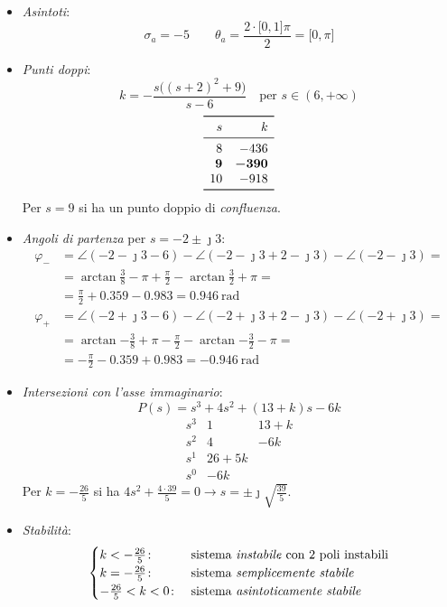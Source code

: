 \begin{itemize}
	\item \emph{Asintoti}:
		\[
			\sigma_a = -5 \qquad
			\theta_a = \frac{2\cdot\bigl[0,1\bigr]\pi}{2} = \bigl[0,\pi\bigr]
		\]
	\item \emph{Punti doppi}:
		\[
			k = -\frac{s\bigl((s+2)^2+9\bigr)}{s-6} \quad
			\text{per } s \in (6,+\infty)
		\]
		\[\begin{array}{rr}
			\toprule
			     s &         k \\
			\midrule
			     8 &      -436 \\
			\bm{9} & \bm{-390} \\
			    10 &      -918 \\
			\bottomrule
		\end{array}\]
		Per \(s=9\) si ha un punto doppio di \emph{confluenza}.
	\item \emph{Angoli di partenza} per \(s=-2\pm\jmath3\):
		\begin{align*}
			\varphi_- &= \angle(-2-\jmath3-6) -\angle(-2-\jmath3+2-\jmath3) -\angle(-2-\jmath3) = \\
				  &= \arctan{\frac{3}{8}} -\pi +\frac{\pi}{2} -\arctan{\frac{3}{2}} +\pi = \\
				  &= \frac{\pi}{2} +0.359 -0.983 = \SI{0.946}{\radian} \\
			\varphi_+ &= \angle(-2+\jmath3-6) -\angle(-2+\jmath3+2-\jmath3) -\angle(-2+\jmath3) = \\
				  &= \arctan{-\frac{3}{8}} +\pi -\frac{\pi}{2} -\arctan{-\frac{3}{2}} -\pi = \\
				  &= -\frac{\pi}{2} -0.359 +0.983 = \SI{-0.946}{\radian}
		\end{align*}
	\item \emph{Intersezioni con l'asse immaginario}:
		\[
			P(s) = s^3 +4s^2 +(13+k)s -6k
		\]
		\[\begin{array}{r|rr}
			s^3 & 1 & 13+k \\
			s^2 & 4 & -6k  \\
			s^1 & 26+5k    \\
			s^0 & -6k
		\end{array}\]
		Per \(k = -\frac{26}{5}\) si ha \(4s^2+\frac{4\cdot39}{5}=0 \rightarrow s=\pm\jmath\sqrt{\frac{39}{5}}\).
	\item \emph{Stabilità}:
		\[\begin{cases}
			k < -\frac{26}{5}\colon & \text{sistema \emph{instabile} con 2 poli instabili} \\
			k = -\frac{26}{5}\colon & \text{sistema \emph{semplicemente stabile}} \\
			-\frac{26}{5} < k < 0\colon & \text{sistema \emph{asintoticamente stabile}}
		\end{cases}\]
\end{itemize}

